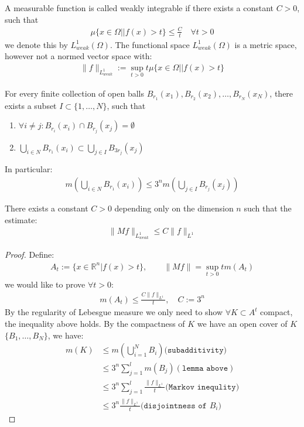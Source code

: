 \begin{definition}
	A measurable function is called weakly integrable if there exists a constant $C > 0$, such that
	\begin{align*}
		\mu\{ x \in \Omega| |f(x) > t\} \le \frac{C}{t} \quad \forall t >0
	\end{align*}
	we denote this by $L^1_{weak}(\Omega)$. The functional space $L^1_{weak}(\Omega)$ is a metric space, however not a normed vector space with:
	\begin{align*}
		\|f\|_{L^1_{weak}}:= \sup_{t >0} t\mu\{x \in \Omega| |f(x)>t\}
	\end{align*}
\end{definition}

\begin{lemma}
	For every finite collection of open balls $B_{r_1}(x_1), B_{r_2}(x_2), \dots, B_{r_N}(x_N)$, there exists a subset $I \subset \{1, \dots, N\}$, such that 
	\begin{enumerate}
		\item $\forall i \neq j: B_{r_i}(x_i) \cap B_{r_j}(x_j) = \emptyset$
		\item $\bigcup_{i \in N} B_{r_1}(x_i) \subset \bigcup_{j \in I} B_{3r_j}(x_j)$
	\end{enumerate} 
	In particular:
	\begin{align*}
		m(\bigcup_{i \in N} B_{r_1}(x_i)) \le 3^n m(\bigcup_{j \in I} B_{r_j}(x_j))
	\end{align*}
\end{lemma}

\begin{theorem}
	There exists a constant $C > 0$ depending only on the dimension $n$ such that the estimate:
	\begin{align*}
		\|M f\|_{L^1_{weak}} \le C\|f\|_{L^1}
	\end{align*} 
\end{theorem}
\begin{proof}
Define:
\begin{align*}
	A_t:= \{x \in \mathbb{R}^n| f(x) > t\}, \qquad \|Mf\| = \sup_{t >0} t m(A_t)
\end{align*}
we would like to prove $\forall t > 0$:
\begin{align*}
	m(A_t) \le \frac{C\|f\|_{L^1}}{t}, \quad  C:= 3^n
\end{align*}
By the regularity of Lebesgue measure we only need to show $\forall K \subset A^t$ compact, the inequality above holds. By the compactness of $K$ we have an open cover of $K$ $\{B_1, \dots, B_N\}$, we have:
\begin{align*}
	m(K) &\le m(\bigcup_{i = 1}^N B_i)\texttt{(subadditivity)}\\
	&\le 3^n \sum_{j = 1}^l m(B_j) (\texttt{lemma above}) \\
	&\le 3^n \sum_{j = 1}^l \frac{\|f\|_{L^1}}{t}(\texttt{Markov inequlity)} \\
	&\le 3^n \frac{\|f\|_{L^1}}{t}(\texttt{disjointness of $B_i$)}
\end{align*}
\end{proof}


